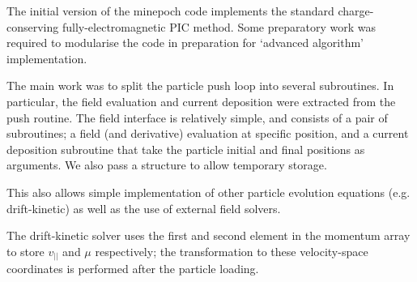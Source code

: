 \documentclass{article}
\begin{document}
The initial version of the minepoch code implements the standard charge-conserving fully-electromagnetic PIC method. Some preparatory work was required to modularise the code in preparation for `advanced algorithm' implementation.

The main work was to  split the particle push loop into several subroutines. In particular, the field evaluation and current deposition were extracted from the push routine. The field interface is relatively simple, and consists of a pair of subroutines; a field (and derivative) evaluation at specific position, and a current deposition subroutine that take the particle initial and final positions as arguments. We also pass a structure
to allow temporary storage.

This also allows simple implementation of other particle evolution equations (e.g. drift-kinetic) as well as the use of external field solvers.

The drift-kinetic solver uses the first and second element in the momentum array to store $v_{||}$ and $\mu$ respectively; the transformation to these velocity-space coordinates is performed after the particle loading.


\end{document}
